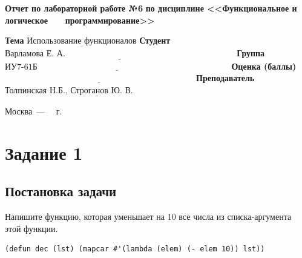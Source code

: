 \documentclass[12pt]{report}
\begin{document}
\begin{titlepage}
		\begin{center}
			\noindent\begin{minipage}{1.1\textwidth}\centering
				\Large\textbf{  Отчет по лабораторной работе №6}\newline
				\textbf{по дисциплине <<Функциональное и логическое}\newline
				\textbf{~~~программирование>>}\newline\newline
			\end{minipage}
		\end{center}
		
		\noindent\textbf{Тема} $\underline{\text{Использование функционалов}}$\newline\newline
		\noindent\textbf{Студент} $\underline{\text{Варламова Е. А.~~~~~~~~~~~~~~~~~~~~~~~~~~~~~~~~~~~~~~~~~~~~~~~~~~~~~~~~~~~~}}$\newline\newline
		\noindent\textbf{Группа} $\underline{\text{ИУ7-61Б~~~~~~~~~~~~~~~~~~~~~~~~~~~~~~~~~~~~~~~~~~~~~~~~~~~~~~~~~~~~~~~~~~~~}}$\newline\newline
		\noindent\textbf{Оценка (баллы)} $\underline{\text{~~~~~~~~~~~~~~~~~~~~~~~~~~~~~~~~~~~~~~~~~~~~~~~~~~~~~~~~~~~~~~~~~~~}}$\newline\newline
		\noindent\textbf{Преподаватель} $\underline{\text{Толпинская Н.Б., Строганов Ю. В.~~~~~~~~~~~~~~~~~~~~}}$\newline\newline\newline
		
		\begin{center}
			\vfill
			Москва~---~\the\year
			~г.
		\end{center}
	\end{titlepage}
\setcounter{page}{2}
\section*{Задание 1}
\subsection*{Постановка задачи}
Напишите функцию, которая уменьшает на 10 все числа из списка-аргумента этой
функции.

\begin{lstlisting}
(defun dec (lst) (mapcar #'(lambda (elem) (- elem 10)) lst))
\end{lstlisting}
\end{document}
